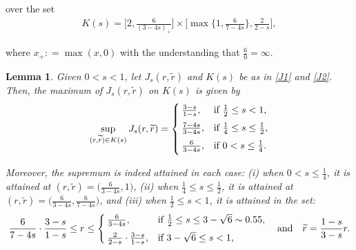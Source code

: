 \documentclass[letterpaper, 11pt,  reqno]{amsart}
\newtheorem{lemma}[theorem]{Lemma}
\newcommand{\1}{\hspace{0.5mm}\text{I}\hspace{0.5mm}}
\newcommand{\noi}{\noindent}
\newcommand{\wt}{\widetilde}
\numberwithin{equation}{section}
\numberwithin{theorem}{section}
\begin{document}
\noi
over the set 
\begin{align}
 K(s)= \bigg[ 2,\frac{6}{(3-4s)_+}\bigg] \times \bigg[\max\Big\{1,\frac{6}{7-4s}\Big\}, \frac{2}{2-s}\bigg],   
\label{J2}
\end{align}


\noi
where $x_+ : = \max(x, 0)$ 
with the understanding that $\frac60 = \infty$.


\begin{lemma}\label{LEM:max} 
Given $0<s<1$, let 
$ J_s(r,\wt r)$ and 
$K(s)$ be as in \eqref{J1} and \eqref{J2}.
Then, the maximum of  $ J_s(r,\wt r)$  on $K(s)$ is given by 
\[  \sup_{(r, \wt r) \in K(s)}  J_s(r, \wt r)
= \begin{cases}
\rule[-3mm]{0pt}{0pt}
 \frac{3-s}{1-s}, & \text{if }  \frac12 \leq s < 1, \\
\rule[-3mm]{0pt}{0pt}
 \frac{7-4s}{3-4s}, & \text{if } \frac14 \le s \le \frac12, \\
\rule[-2.5mm]{0pt}{0pt}
 \frac{6}{3-4s}, & \text{if } 0 < s \le \frac14. 
\end{cases}
\]
%

\noi
Moreover, the supremum is indeed attained in each case:
\textup{(i)} when $0 < s \le \frac14$, it is attained at $(r, \wt r) = \big( \frac{6}{3-4s}, 1\big)$, 
\textup{(ii)} when $\frac14\le s \le \frac12$, it is attained at
$(r, \wt r) = \big( \frac{6}{3-4s}, \frac{6}{7-4s}\big)$, 
and
\textup{(iii)}
when $ \frac 12 \leq s < 1$,  it is attained in the set:
\begin{align}
  \frac{6}{7-4s}\cdot \frac{3-s}{1-s}
\le r \le 
\begin{cases}
\rule[-3mm]{0pt}{0pt}
\frac{6}{3-4s}, &  \text{if } \frac12 \le s \le 3-\sqrt{6}\sim 0.55,   \\
\frac{2}{2-s} \cdot \frac{3-s}{1-s}, & \text{if }  3-\sqrt{6}    \leq s < 1, 
\end{cases}
\quad \text{and}
\quad 
\wt r = \frac{1-s}{3-s} r.
\label{J3}
\end{align}

\end{lemma} 
 
\end{document}
